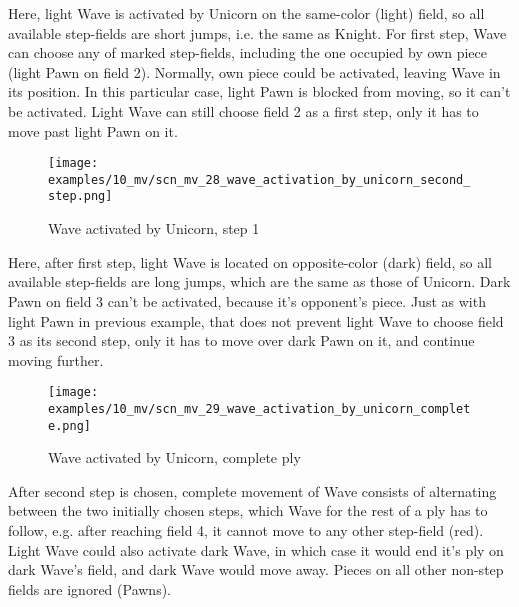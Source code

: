 \vspace*{-0.3\baselineskip}
Here, light Wave is activated by Unicorn on the same-color (light) field, so all available
step-fields are short jumps, i.e. the same as Knight. For first step, Wave can choose any of
marked step-fields, including the one occupied by own piece (light Pawn on field 2). Normally,
own piece could be activated, leaving Wave in its position. In this particular case, light Pawn
is blocked from moving, so it can't be activated. Light Wave can still choose field 2 as a first
step, only it has to move past light Pawn on it.

\clearpage %

\vspace*{-2.1\baselineskip}
\noindent
\begin{figure}[!h]
\texttt{[image: examples/10\_mv/scn\_mv\_28\_wave\_activation\_by\_unicorn\_second\_step.png]}
\caption{Wave activated by Unicorn, step 1}
\label{fig:scn_mv_28_wave_activation_by_unicorn_second_step}
\end{figure}

Here, after first step, light Wave is located on opposite-color (dark) field, so all available
step-fields are long jumps, which are the same as those of Unicorn. Dark Pawn on field 3 can't be
activated, because it's opponent's piece. Just as with light Pawn in previous example, that does
not prevent light Wave to choose field 3 as its second step, only it has to move over dark Pawn
on it, and continue moving further.

\clearpage %

\vspace*{-2.1\baselineskip}
\noindent
\begin{figure}[!h]
\texttt{[image: examples/10\_mv/scn\_mv\_29\_wave\_activation\_by\_unicorn\_complete.png]}
\caption{Wave activated by Unicorn, complete ply}
\label{fig:scn_mv_29_wave_activation_by_unicorn_complete}
\end{figure}

After second step is chosen, complete movement of Wave consists of alternating between the two initially
chosen steps, which Wave for the rest of a ply has to follow, e.g. after reaching field 4, it cannot move
to any other step-field (red). Light Wave could also activate dark Wave, in which case it would end it's
ply on dark Wave's field, and dark Wave would move away. Pieces on all other non-step fields are ignored
(Pawns).

